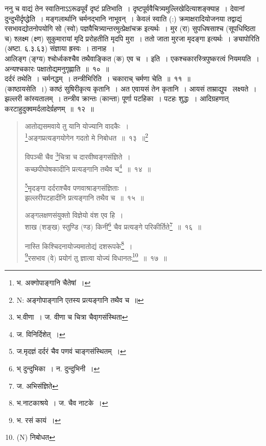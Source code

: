 \documentclass[11pt, openany]{book}
\begin{document}
ननु च वाद्यं तेन स्वातिनाऽऽरूढपूर्वं दृष्टं प्रतिभाति~। दृष्टपूर्ववैचित्र्यमुल्लिखेदित्याशङ्क्याह~। {\qtt देवानां} दुन्दुभीर्दृष्द्धेति~। मङ्गलार्थानि चर्मनद्भानि नाभूवन्~। केवलं स्वाति (:) क्रमाक्षरादियोजनया तद्वाद्यं रसभावद्योतनोपयोगि सो (स्वो) पज्ञवैचित्र्यान्तरमुत्प्रेक्षांचक्र इत्यर्थः~। मुर (रा) सुपधिषसाश्च (सूपधिष्ठिता च) श्लक्ष्म (क्ष्ण) सुकुमारायां मृदि प्ररोहतीति मृदपि मुरा~। ततो जाता मुरजा मृदङ्गा इत्यर्थः~। ङ्यापोरिति (अष्टा. ६.३.६३) संज्ञाया ह्रस्वः~। तानाह~।\\

आलिङ्ग (ङ्ग्य) श्चोर्ध्वकश्चैव तथैवाङ्कित (क) एव च~। इति~। एकश्चकारस्त्रिपुष्करत्वं नियमयति~। अन्यश्चकारः पक्षातोद्यमनुगृह्णाति~॥~१०~॥\\

दर्दरं तथेति~। {\qtt चर्मनद्धम्}~। तन्त्रीभिरिति~। चकाराच् चर्मणा चेति~॥~११~॥\\

(काष्ठायसेति~।) काष्ठं सुषिरीकृत्य कृतानि~। अत एवायसं तेन कृतानि~। आयसं ताम्राद्युप \textendash\ लक्ष्यते~। झल्लरी कांस्यतालम्~। तन्त्रीव क्रान्तः (कान्ता) पूर्णा पटहिका~। पटहः शुद्धः~। आदिग्रहणात् करटाहुदुक्वमर्दलादेर्ग्रहणम्~॥~१२~॥

\newpage

\begin{quote}
{\na  आतोद्यसमवाये तु यानि योज्यानि वादकैः~।\\
 \renewcommand{\thefootnote}{1}\footnote{भ. अक्गोपाङ्गानि चैतेषां~।}अङ्गप्रत्यङ्गयोगेन गदतो मे निबोधत~॥~१३~॥\renewcommand{\thefootnote}{1a}\footnote{N: अङ्गोपाङ्गानि एतस्य प्रत्यङ्गानि तथैव च~॥}

 विपञ्ची चैव \renewcommand{\thefootnote}{2}\footnote{भ.वीणा~। ज. वीणा च चित्रा  चैवा्गसंस्थिता}चित्रा च दारवीष्वङ्गसंज्ञिते~।\\
 कच्छपीघोषकादीनि प्रत्यङ्गानि तथैव च\renewcommand{\thefootnote}{3}\footnote{ज. विनिर्दिशेत्~।}~॥~१४~॥

 \renewcommand{\thefootnote}{4}\footnote{ज.मृदज्ञं दर्दरं चैव पणवं चाङ्गसंस्थितम्~।}मृदङ्गा दर्दराश्चैव पणवाश्राङ्गसंज्ञिताः~।\\
 झल्लरीपटहादीनि प्रत्यङ्गानि तथैव च~॥~१५~॥

 अङ्गलक्षणसंयुक्तो विज्ञेयो वंश एव हि~।\\
 शाख (शङ्ख) स्तुण्डि (ण्ड) किनी\renewcommand{\thefootnote}{5}\footnote{भ् दुन्दुभिका~। न. दुन्दुभिनी~।} चैव प्रत्यङ्गे परिकीर्तिते\renewcommand{\thefootnote}{6}\footnote{ज. अभिसंज्ञिते}~॥~१६~॥

 नास्ति किश्चिदनायोज्यमातोद्यं दशरूपके\renewcommand{\thefootnote}{7}\footnote{भ.नाटकाश्रये~। ज. चैव नाटके~।}~।\\
 \renewcommand{\thefootnote}{8}\footnote{भ. रसं कायं~।}रसभाव (वे) प्रयोगं तु ज्ञात्वा योज्यं विधानतः\renewcommand{\thefootnote}{9}\footnote{(N) निबोधत}~॥~१७~॥}
\end{quote}
\end{document}
